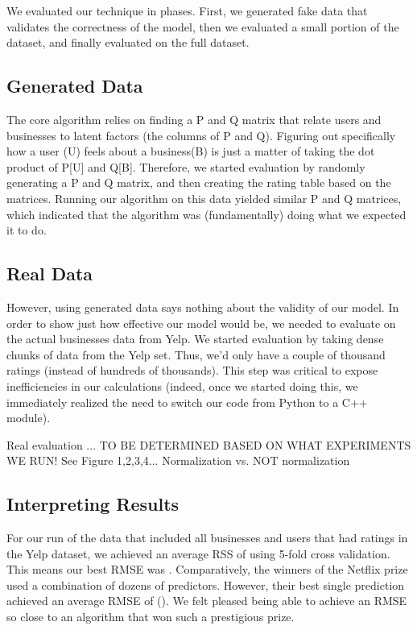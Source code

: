 We evaluated our technique in phases. First, we generated fake data that validates the correctness of the model, then we evaluated a small portion of the 
dataset, and finally evaluated on the full dataset.

\subsection{Generated Data}
The core algorithm relies on finding a P and Q matrix that relate users and businesses to latent factors (the columns of P and Q). 
Figuring out specifically how a user (U) feels about a business(B) is just a matter of taking the dot product of P[U] and Q[B]. 
Therefore, we started evaluation by randomly generating a P and Q matrix, and then creating the rating table based on the 
matrices. Running our algorithm on this data yielded similar P and Q matrices, which indicated that the algorithm was (fundamentally) doing what
we expected it to do.

\subsection{Real Data}
However, using generated data says nothing about the validity of our model. In order to show just how effective our model would be, we needed to evaluate on the actual
businesses data from Yelp. We started evaluation by taking dense chunks of data from the Yelp set. Thus, we'd only have a couple of thousand ratings (instead of hundreds of thousands). 
This step was critical to expose inefficiencies in our calculations (indeed, once we started doing this, we immediately realized the need to switch our code from Python to a C++ module).

Real evaluation ... TO BE DETERMINED BASED ON WHAT EXPERIMENTS WE RUN!
See Figure 1,2,3,4...
Normalization vs. NOT normalization

\subsection{Interpreting Results}
For our run of the data that included all businesses and users that had ratings in the Yelp dataset, we achieved an average RSS of \bestRSS using 5-fold cross validation. This means our best RMSE was \bestRMSE. Comparatively, the winners of the Netflix prize used a combination of dozens of predictors. However, their best single prediction achieved an average RMSE of \bestNetflixRMSE (\cite{netprize}).
We felt pleased being able to achieve an RMSE so close to an algorithm that won such a prestigious prize. 


